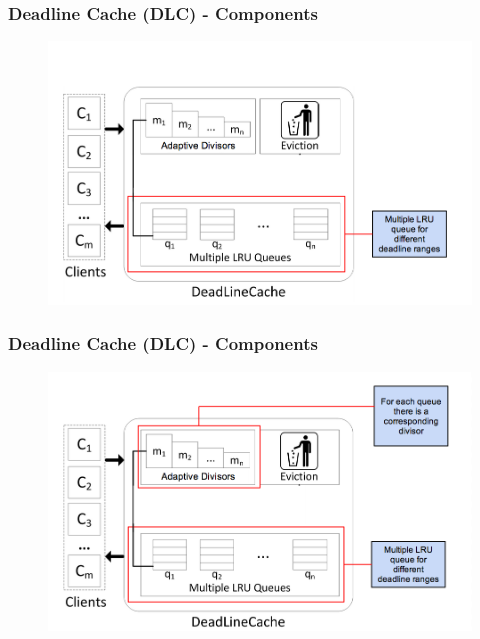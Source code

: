 \documentclass{beamer}
\begin{document}
\begin{frame}
  \frametitle{Deadline Cache (DLC) - Components}
  \vspace{0.5 mm}
  \begin{figure}
    \begin{center}
      \centerline{\includegraphics[scale=0.33]{img/DLC_ARC_1.png}}
    \end{center}
  \end{figure}
\end{frame}


\begin{frame}
  \frametitle{Deadline Cache (DLC) - Components}
  \begin{figure}
    \begin{center}
      \centerline{\includegraphics[scale=0.33]{img/DLC_ARC_2.png}}
    \end{center}
  \end{figure}
\end{frame}
\end{document}
